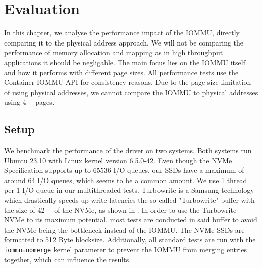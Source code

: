 \chapter{Evaluation}
In this chapter, we analyse the performance impact of the IOMMU, directly comparing it to the physical address approach. We will not be comparing the performance of memory allocation and mapping as in high throughput applications it should be negligable. The main focus lies on the IOMMU itself and how it performs with different page sizes. All performance tests use the Container IOMMU API for consistency reasons.
Due to the page size limitation of using physical addresses, we cannot compare the IOMMU to physical addresses using \qty{4}{\kibi\byte} pages.

\section{Setup}
We benchmark the performance of the driver on two systems.
Both systems run Ubuntu 23.10 with Linux kernel version 6.5.0-42.
Even though the NVMe Specification supports up to 65536 I/O queues, our SSDs have a maximum of around 64 I/O queues, which seems to be a common amount. We use 1 thread per 1 I/O queue in our multithreaded tests. Turbowrite is a Samsung technology which drastically speeds up write latencies the so called "Turbowrite" buffer with the size of \qty{42}{\giga\byte} of the NVMe, as shown in \cite{vroom}. In order to use the Turbowrite NVMe to its maximum potential, most tests are conducted in said buffer to avoid the NVMe being the bottleneck instead of the IOMMU.
The NVMe SSDs are formatted to 512 Byte blocksize.
Additionally, all standard tests are run with the \texttt{iommu=nomerge} kernel parameter to prevent the IOMMU from merging entries together, which can influence the results.

